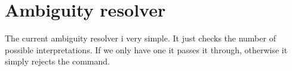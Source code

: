 \section*{Ambiguity resolver}
The current ambiguity resolver i very simple. It just checks the number of
possible interpretations. If we only have one it passes it through, otherwise
it simply rejects the command.

